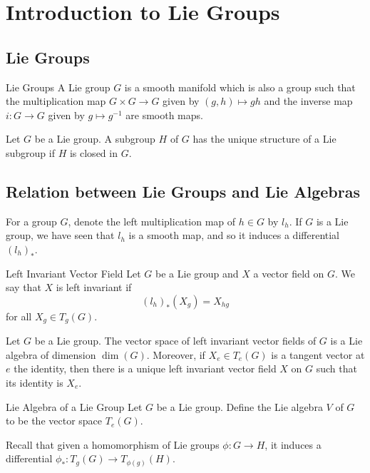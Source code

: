 \documentclass[a4paper]{article}
\begin{document}
\pagebreak
\section{Introduction to Lie Groups}
\subsection{Lie Groups}
\begin{defn}{Lie Groups}{} A Lie group $G$ is a smooth manifold which is also a group such that the multiplication map $G\times G\to G$ given by $(g,h)\mapsto gh$ and the inverse map $i:G\to G$ given by $g\mapsto g^{-1}$ are smooth maps. 
\end{defn}

\begin{prp}{}{} Let $G$ be a Lie group. A subgroup $H$ of $G$ has the unique structure of a Lie subgroup if $H$ is closed in $G$. 
\end{prp}

\subsection{Relation between Lie Groups and Lie Algebras}
For a group $G$, denote the left multiplication map of $h\in G$ by $l_h$. If $G$ is a Lie group, we have seen that $l_h$ is a smooth map, and so it induces a differential $(l_h)_\ast$. 

\begin{defn}{Left Invariant Vector Field}{} Let $G$ be a Lie group and $X$ a vector field on $G$. We say that $X$ is left invariant if $$(l_h)_\ast(X_g)=X_{hg}$$ for all $X_g\in T_g(G)$. 
\end{defn}

\begin{prp}{}{} Let $G$ be a Lie group. The vector space of left invariant vector fields of $G$ is a Lie algebra of dimension $\dim(G)$. Moreover, if $X_e\in T_e(G)$ is a tangent vector at $e$ the identity, then there is a unique left invariant vector field $X$ on $G$ such that its identity is $X_e$. 
\end{prp}

\begin{defn}{Lie Algebra of a Lie Group}{} Let $G$ be a Lie group. Define the Lie algebra $V$ of $G$ to be the vector space $T_e(G)$. 
\end{defn}

Recall that given a homomorphism of Lie groups $\phi:G\to H$, it induces a differential $\phi_\ast:T_g(G)\to T_{\phi(g)}(H)$. 
\end{document}
